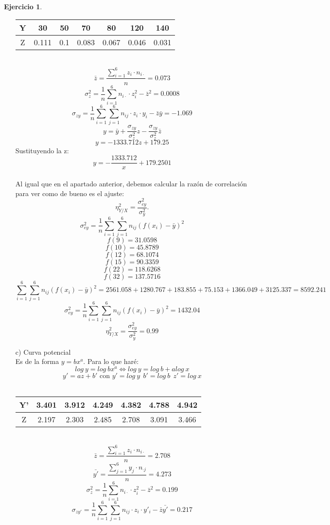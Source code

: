 \documentclass[a4paper, 12pt]{article}
\theoremstyle{definition}
\newtheorem{ej}{Ejercicio}
\begin{document}
\begin{ej}
\begin{enumerate}
    \begin{tabular}{c|cccccc}
         Y & 30 & 50 & 70 & 80 & 120 & 140 \\ \hline
         Z & 0.111 & 0.1 & 0.083 & 0.067 & 0.046 & 0.031
    \end{tabular} \\
    $$\bar{z} = \dfrac{\displaystyle \sum_{i = 1}^6 z_i \cdot n_{i \cdot}}{n} = 0.073 $$
    $$\sigma_z^2 = \frac{1}{n} \displaystyle \sum_{i = 1}^6 n_{i \cdot} \cdot z_i^2 - \bar{z}^2 = 0.0008 $$
    $$\sigma_{zy} = \frac{1}{n}   \displaystyle \sum_{i = 1}^6 \sum_{j=1}^6 n_{ij} \cdot z_i \cdot y_i - \bar{z} \bar{y} = -1.069$$
    $$y = \bar{y} + \frac{\sigma_{zy}}{\sigma_z^2}z - \frac{\sigma_{zy}}{\sigma_z^2}\bar{z}$$
    $$y = -1333.712z + 179.25$$
    Sustituyendo la z: 
    $$y = -\frac{1333.712}{x} + 179.2501$$
    \\
    Al igual que en el apartado anterior, debemos calcular la razón de correlación para ver como de bueno es el ajuste:
    \\
    $$\eta_{Y/X}^2 = \frac{\sigma_{ey}^2}{\sigma_y^2}.$$
    $$\sigma_{ey}^2 = \frac{1}{n} \displaystyle\sum_{i = 1}^6 \sum_{j = 1}^6 n_{ij}(f(x_i) - \bar{y})^2$$
    $$f(9) = 31.0598$$
    $$f(10) = 45.8789$$
    $$f(12) = 68.1074$$
    $$f(15) = 90.3359$$
    $$f(22) = 118.6268$$
    $$f(32) = 137.5716$$
    $$\displaystyle\sum_{i=1}^6 \sum_{j=1}^6 n_{ij}(f(x_i) - \bar{y})^2 = 2561.058 + 1280.767 + 183.855 + 75.153 + 1366.049 + 3125.337 = 8592.241$$
    $$\sigma_{ey}^2 = \frac{1}{n} \displaystyle\sum_{i = 1}^6 \sum_{j=1}^6 n_{ij}(f(x_i) - \bar{y})^2 = 1432.04$$
    $$\eta_{Y/X}^2 = \dfrac{\sigma_{ey}^2}{\sigma_y^2} = 0.99$$
    \item[c) ] Curva potencial
    \\
    Es de la forma $y = bx^a$. Para lo que haré:
    $$log \ y = log \ bx^a \iff log \ y = log \ b + alog \ x$$
    $$y' = az + b' \text{ con } y' = log \ y \ \ b' = log \ b \  \ z' = log \ x $$
    \\
    \begin{tabular}{c|cccccc}
         Y' & 3.401 & 3.912 & 4.249 & 4.382 & 4.788 & 4.942 \\ \hline
         Z & 2.197 & 2.303 & 2.485 & 2.708 & 3.091 & 3.466
    \end{tabular}
    \\
    $$\bar{z} = \dfrac{\displaystyle \sum_{i = 1}^6 z_i \cdot n_{i \cdot}}{n} = 2.708 $$
    $$\bar{y'} = \dfrac{\displaystyle \sum_{j = 1}^6 y_j \cdot n_{\cdot j}}{n} = 4.273 $$
    $$\sigma_z^2 = \frac{1}{n} \displaystyle \sum_{i = 1}^6 n_{i \cdot} \cdot z_i^2 - \bar{z}^2 = 0.199$$
    $$\sigma_{zy'} = \frac{1}{n}   \displaystyle \sum_{i = 1}^6 \sum_{j=1}^6 n_{ij} \cdot z_i \cdot y'_i - \bar{z} \bar{y'} = 0.217$$
    

\end{enumerate}
\end{ej}
\end{document}
